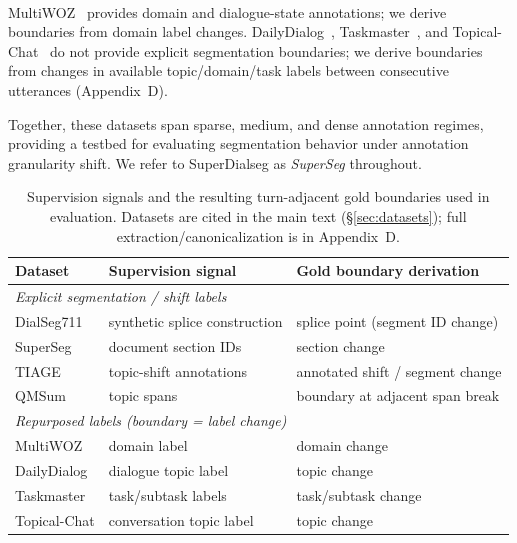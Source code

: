 \documentclass{article}
\makeatletter
\newcommand{\myparagraph}[1]{%
  \paragraph{\@addpunct{#1}}%
}
\makeatother
\begin{document}
\myparagraph{Repurposed labels}
MultiWOZ~\cite{budzianowski2018multiwoz} provides domain and dialogue-state
annotations; we derive boundaries from domain label changes.
DailyDialog~\cite{li2017dailydialog},
Taskmaster~\cite{byrne2019taskmaster}, and
Topical-Chat~\cite{gopalakrishnan2019topicalchat} do not provide explicit
segmentation boundaries; we derive boundaries from changes in available
topic/domain/task labels between consecutive utterances (Appendix~D).

Together, these datasets span sparse, medium, and dense annotation regimes,
providing a testbed for evaluating segmentation behavior under annotation
granularity shift. We refer to SuperDialseg as \emph{SuperSeg} throughout.

\begin{table}[t]
  \centering
  \small
  \setlength{\tabcolsep}{5pt}
  \begin{tabular}{lll}
    \toprule
    \textbf{Dataset} & \textbf{Supervision signal} & \textbf{Gold boundary derivation} \\
    \midrule
    \multicolumn{3}{l}{\textit{Explicit segmentation / shift labels}} \\
    \quad DialSeg711 & synthetic splice construction & splice point (segment ID change) \\
    \quad SuperSeg & document section IDs & section change \\
    \quad TIAGE & topic-shift annotations & annotated shift / segment change \\
    \quad QMSum & topic spans & boundary at adjacent span break \\
    \midrule
    \multicolumn{3}{l}{\textit{Repurposed labels (boundary = label change)}} \\
    \quad MultiWOZ & domain label & domain change \\
    \quad DailyDialog & dialogue topic label & topic change \\
    \quad Taskmaster & task/subtask labels & task/subtask change \\
    \quad Topical-Chat & conversation topic label & topic change \\
    \bottomrule
  \end{tabular}
  \caption{Supervision signals and the resulting turn-adjacent gold boundaries used in evaluation.
    Datasets are cited in the main text (§\ref{sec:datasets}); full extraction/canonicalization is in Appendix~D.}
  \label{tab:segmentation-philosophy}
\end{table}
\end{document}
